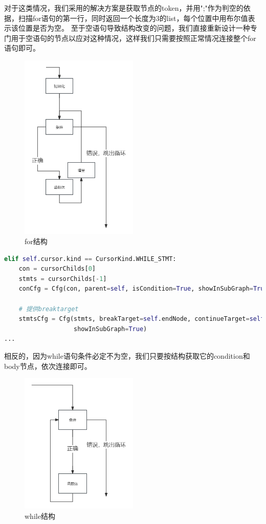 对于这类情况，我们采用的解决方案是获取节点的token，并用";"作为判空的依据，扫描for语句的第一行，同时返回一个长度为3的list，每个位置中用布尔值表示该位置是否为空。
至于空语句导致结构改变的问题，我们直接重新设计一种专门用于空语句的节点以应对这种情况，这样我们只需要按照正常情况连接整个for语句即可。
 \begin{figure}[htbp]
	\centering
	\includegraphics[width=0.5\textwidth]{pictures/for结构.png}
	\caption{for结构}
	\label{fig:for结构}
\end{figure}
{\small
\begin{lstlisting}[language=Python]
elif self.cursor.kind == CursorKind.WHILE_STMT:
    con = cursorChilds[0]
    stmts = cursorChilds[-1]
    conCfg = Cfg(con, parent=self, isCondition=True, showInSubGraph=True, label="WHILE_COND")

    # 提供breaktarget
    stmtsCfg = Cfg(stmts, breakTarget=self.endNode, continueTarget=self.startNode, parent=self,
                   showInSubGraph=True)
...
\end{lstlisting}
}
相反的，因为while语句条件必定不为空，我们只要按结构获取它的condition和body节点，依次连接即可。
 \begin{figure}[htbp]
	\centering
	\includegraphics[width=0.5\textwidth]{pictures/while结构.png}
	\caption{while结构}
	\label{fig:while结构}
\end{figure}
